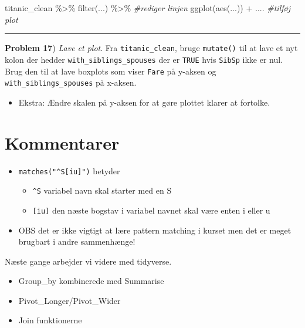 \documentclass[
]{book}
\newenvironment{Shaded}{\begin{snugshade}}{\end{snugshade}}
\newcommand{\CommentTok}[1]{\textcolor[rgb]{0.56,0.35,0.01}{\textit{#1}}}
\newcommand{\FunctionTok}[1]{\textcolor[rgb]{0.00,0.00,0.00}{#1}}
\newcommand{\NormalTok}[1]{#1}
\newcommand{\SpecialCharTok}[1]{\textcolor[rgb]{0.00,0.00,0.00}{#1}}
\providecommand{\tightlist}{%
  \setlength{\itemsep}{0pt}\setlength{\parskip}{0pt}}
\begin{document}
\begin{Shaded}
\begin{Highlighting}[]
\NormalTok{titanic\_clean }\SpecialCharTok{\%\textgreater{}\%} 
  \FunctionTok{filter}\NormalTok{(...) }\SpecialCharTok{\%\textgreater{}\%} \CommentTok{\#rediger linjen}
  \FunctionTok{ggplot}\NormalTok{(}\FunctionTok{aes}\NormalTok{(...)) }\SpecialCharTok{+}\NormalTok{ .... }\CommentTok{\#tilføj plot}
\end{Highlighting}
\end{Shaded}

\begin{center}\rule{0.5\linewidth}{0.5pt}\end{center}

\textbf{Problem 17}) \emph{Lave et plot}. Fra \texttt{titanic\_clean}, bruge \texttt{mutate()} til at lave et nyt kolon der hedder \texttt{with\_siblings\_spouses} der er \texttt{TRUE} hvis \texttt{SibSp} ikke er nul. Brug den til at lave boxplots som viser \texttt{Fare} på y-aksen og \texttt{with\_siblings\_spouses} på x-aksen.

\begin{itemize}
\tightlist
\item
  Ekstra: Ændre skalen på y-aksen for at gøre plottet klarer at fortolke.
\end{itemize}

\hypertarget{kommentarer}{%
\section{Kommentarer}\label{kommentarer}}

\begin{itemize}
\tightlist
\item
  \texttt{matches("\^{}S{[}i\textbar{}u{]}")} betyder

  \begin{itemize}
  \tightlist
  \item
    \texttt{\^{}S} variabel navn skal starter med en S
  \item
    \texttt{{[}i\textbar{}u{]}} den næste bogstav i variabel navnet skal være enten i eller u
  \end{itemize}
\item
  OBS det er ikke vigtigt at lære pattern matching i kurset men det er meget brugbart i andre sammenhænge!
\end{itemize}

Næste gange arbejder vi videre med tidyverse.

\begin{itemize}
\tightlist
\item
  Group\_by kombinerede med Summarise
\item
  Pivot\_Longer/Pivot\_Wider
\item
  Join funktionerne
\end{itemize}
\end{document}
